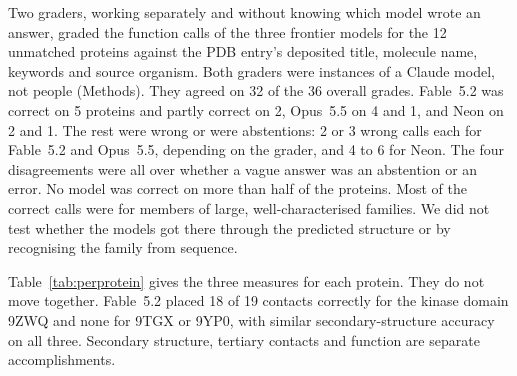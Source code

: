 \documentclass[11pt]{article}
\begin{document}
Two graders, working separately and without knowing which model wrote an answer, graded the function
calls of the three frontier models for the 12 unmatched proteins against the PDB entry's deposited title,
molecule name, keywords and source organism. Both graders
were instances of a Claude model, not people (Methods). They agreed on 32 of the 36 overall grades. Fable~5.2
was correct on 5 proteins and partly correct on 2, Opus~5.5 on 4 and 1, and Neon on 2 and 1. The rest
were wrong or were abstentions: 2 or 3 wrong calls each for Fable~5.2 and Opus~5.5, depending on the
grader, and 4 to 6 for Neon. The four disagreements were all over whether a vague answer was an
abstention or an error. No model was correct on more than half of the proteins. Most of the correct
calls were for members of large, well-characterised families. We did not test whether the models got
there through the predicted structure or by recognising the family from sequence.

Table~\ref{tab:perprotein} gives the three measures for each protein. They do not move together. Fable~5.2
placed 18 of 19 contacts correctly for the kinase domain 9ZWQ and none for 9TGX or 9YP0, with similar
secondary-structure accuracy on all three. Secondary structure, tertiary contacts and function are
separate accomplishments.
\end{document}
